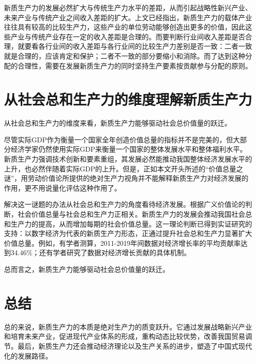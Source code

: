 新质生产力的发展必然扩大与传统生产力水平的差距\cite[39-40]{ChenZhangHongGuanJingJiBoDongShiZhengFenXiDeYiZhongSiLuShiLunShengChanLiFeiPingHengJieGouYuJingJiBoDong1999}，从而引起战略性新兴产业、未来产业与传统产业之间收入差距的扩大\cite[31]{CaiJiMingXinZhiShengChanLiDeFaZhanDuiJieZhiChuangZaoHeJingJiZengChangDeGongXian2024}。上文已经指出，新质生产力的载体产业往往具有较高的比较生产力，这些产业的单位劳动能够创造出更多的价值，因此这些产业与传统产业存在一定的收入差距是合理的。而要判断行业间收入差距是否合理，就要看各行业间的收入差距与各行业间的比较生产力差别是否一致：二者一致就是合理的，应该肯定和保护；二者不一致的部分要缩小和消除\cite[69]{CaiJiMingLongDuanHeJingZhengXingYeDeBiJiaoShengChanLiYuShouRuChaiJuJiYuGuangYiJieZhiLunDeFenXi2014}。而了达到这种分配的合理性，需要在发展新质生产力的同时坚持生产要素按贡献参与分配的原则\cite[58]{CaiJiMingMaKeSiLaoDongShengChanLiYuJieZhiLiangZhengXiangGuanYuanLiDeKuoZhanJiYingYongJianLunXinZhiShengChanLiDeFaZhanYuWoGuoJiBenJingJiZhiDuDeWanShan2025}。

\section{从社会总和生产力的维度理解新质生产力}

从社会总和生产力的维度来看，新质生产力能够驱动社会总价值量的跃迁。

尽管实际GDP作为衡量一个国家全年创造价值总量的指标并不是完美的，但大部分经济学家仍然使用实际GDP来衡量一个国家的整体发展水平和整体福利水平\cite[386]{BaoLuo*SaMouErSenJingJiXueDiShiJiuBan2012}\cite[17-24]{n.GeLiGaoLi*ManKunJingJiXueYuanLiDi7BanHongGuanJingJiFenCe2015}。新质生产力强调技术创新和要素重组，其发展必然能推动我国整体经济发展水平的上升，也必然伴随着实际GDP的上升。但是，正如本文开头所述的“价值总量之谜”，用劳动价值论所提供的绝对生产力视角并不能解释新质生产力对经济发展的作用，更不用说量化评估这种作用了。

解决这一谜题的办法从社会总和生产力的角度看待经济发展。根据广义价值论的判断，社会价值总量与社会总和生产力正相关。新质生产力的发展会推动我国社会总和生产力的提高，从而增加每期的社会价值总量。这一理论判断已得到实证研究的支持：以数字经济为代表的新质生产力形态，正通过提升社会总和生产力显著扩大价值总量。例如，有学者测算，2011-2019年间数据对经济增长率的平均贡献率达到34.46\%\cite[63]{LiuTaoXiongShuJuZiBenGuSuanJiDuiZhongGuoJingJiZengChangDeGongXianJiYuShuJuJieZhiLianDeShiJiao2023}；还有学者研究了数据对经济增长贡献的具体机制\cite{CaiJiMingLunShuJuYaoSuAnGongXianCanYuFenPeiDeJieZhiJiChuJiYuGuangYiJieZhiLunDeShiJiao2023}\cite{RenBaoPingShuZiXinZhiShengChanLiTuiDongJingJiGaoZhiLiangFaZhanDeLuoJiYuLuJing2023}。

总而言之，新质生产力能够驱动社会总价值量的跃迁。

\section{总结}

总的来说，新质生产力的本质是绝对生产力的质变跃升。它通过发展战略新兴产业和培育未来产业，促进现代产业体系的形成，重构动态比较优势，改善我国贸易调节。最后，新质生产力还会推动经济理论以及生产关系的进步，塑造了中国式现代化的发展路径。